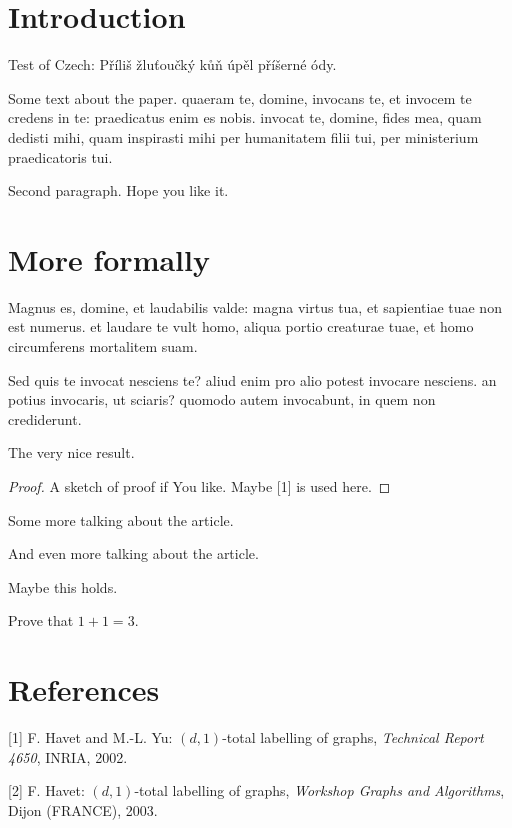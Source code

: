 \documentclass[a4paper,10pt]{article}
\begin{document}
\section{Introduction}

Test of Czech: Příliš žluťoučký kůň úpěl příšerné ódy.

Some text about the paper. 
quaeram te, domine, invocans te, et invocem te credens in te: praedicatus enim es nobis.
invocat te, domine, fides mea, quam dedisti mihi, quam inspirasti mihi per humanitatem 
filii tui, per ministerium praedicatoris tui.

Second paragraph. Hope you like it.

\section{More formally}

\begin{definition}
Magnus es, domine, et laudabilis valde: magna virtus tua, et sapientiae tuae non est numerus. 
et laudare te vult homo, aliqua portio creaturae tuae, et homo circumferens mortalitem suam.
\end{definition}

\begin{lemma}
Sed quis te invocat nesciens te? aliud enim pro alio potest invocare nesciens. 
an potius invocaris, ut sciaris? quomodo autem invocabunt, in quem non crediderunt.
\end{lemma}

\begin{theorem}
The very nice result.
\end{theorem}

\begin{proof}
A sketch of proof if You like. Maybe [1] is used here.
\end{proof}

\begin{corollary}
Some more talking about the article.
\end{corollary}

And even more talking about the article. 

\begin{conjecture}
Maybe this holds.
\end{conjecture}

\begin{exercise}
Prove that $1+1=3$.
\end{exercise}

\section{References}

[1] F. Havet and M.-L. Yu:
    $(d,1)$-total labelling of graphs, \textit{Technical Report 4650}, INRIA,
    2002.

[2] F. Havet:
    $(d,1)$-total labelling of graphs, \textit{Workshop Graphs and Algorithms}, Dijon (FRANCE),
	2003.
\end{document}
